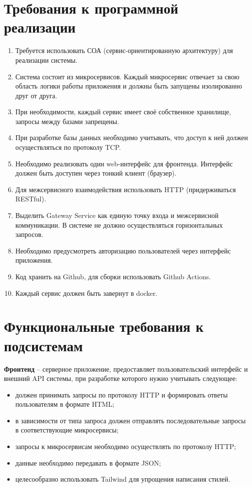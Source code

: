 \section{Требования к программной реализации}
\begin{enumerate}
  \item Требуется использовать СОА (сервис-ориентированную архитектуру) для реализации системы.
	\item Система состоит из микросервисов. Каждый микросервис отвечает за свою область логики работы приложения и должны быть запущены изолированно друг от друга.
	\item При необходимости, каждый сервис имеет своё собственное хранилище,  запросы между базами запрещены.
	\item При разработке базы данных необходимо учитывать, что доступ к ней должен осуществляться по протоколу TCP.
  \item Необходимо  реализовать  один  web-интерфейс  для  фронтенда.  Интерфейс  должен  быть  доступен  через  тонкий  клиент (браузер).
  \item Для межсервисного взаимодействия использовать HTTP (придерживаться RESTful).
  \item Выделить Gateway Service как единую точку входа и межсервисной коммуникации. В системе не должно осуществляться горизонтальных запросов.
	\item Необходимо предусмотреть авторизацию пользователей через интерфейс приложения.
	\item Код хранить на Github, для сборки использовать Github Actions.
	\item Каждый сервис должен быть завернут в docker.
\end{enumerate}


\section{Функциональные требования к подсистемам}

\textbf{Фронтенд} -- серверное  приложение, предоставляет пользовательский интерфейс и внешний API системы, при  разработке которого нужно учитывать следующее:
\begin{itemize}
  \item должен  принимать  запросы  по  протоколу  HTTP и формировать ответы пользователям в формате HTML;
	\item в зависимости от типа запроса должен отправлять последовательные запросы в соответствующие микросервисы;
  \item запросы к микросервисам необходимо осуществлять по протоколу HTTP;
  \item данные необходимо передавать в формате JSON;
  \item целесообразно использовать Tailwind для упрощения написания стилей.
\end{itemize}

